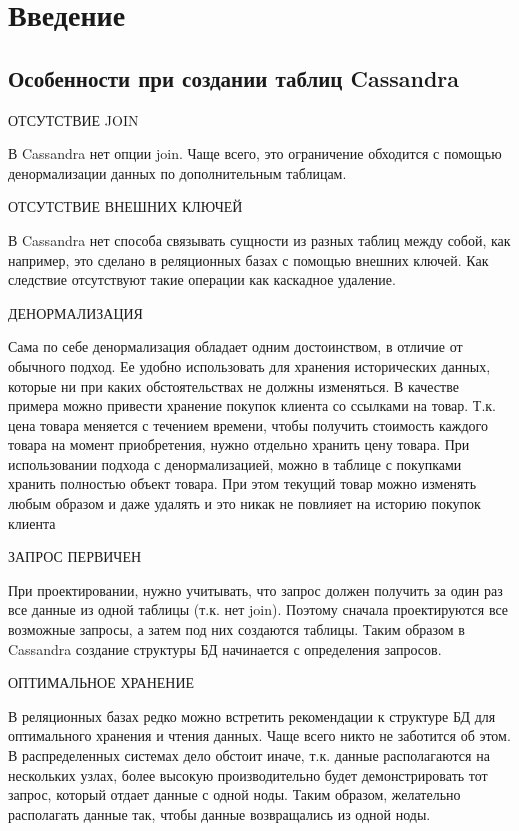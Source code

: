 \section*{\LARGE Введение}
\subsection{Особенности при создании таблиц Cassandra}
ОТСУТСТВИЕ JOIN \par
В Cassandra нет опции join. Чаще всего, это ограничение обходится с
помощью денормализации данных по дополнительным таблицам.

ОТСУТСТВИЕ ВНЕШНИХ КЛЮЧЕЙ \par
В Cassandra нет способа связывать сущности из разных таблиц между
собой, как например, это сделано в реляционных базах с помощью внешних
ключей. Как следствие отсутствуют такие операции как каскадное удаление.

ДЕНОРМАЛИЗАЦИЯ \par
Сама по себе денормализация обладает одним достоинством, в отличие от
обычного подход. Ее удобно использовать для хранения исторических данных,
которые ни при каких обстоятельствах не должны изменяться. В качестве
примера можно привести хранение покупок клиента со ссылками на товар. Т.к.
цена товара меняется с течением времени, чтобы получить стоимость каждого
товара на момент приобретения, нужно отдельно хранить цену товара. При
использовании подхода с денормализацией, можно в таблице с покупками
хранить полностью объект товара. При этом текущий товар можно изменять
любым образом и даже удалять и это никак не повлияет на историю покупок
клиента

ЗАПРОС ПЕРВИЧЕН \par
При проектировании, нужно учитывать, что запрос должен получить за
один раз все данные из одной таблицы (т.к. нет join). Поэтому сначала
проектируются все возможные запросы, а затем под них создаются таблицы.
Таким образом в Cassandra создание структуры БД начинается с определения
запросов.

ОПТИМАЛЬНОЕ ХРАНЕНИЕ \par
В реляционных базах редко можно встретить рекомендации к структуре
БД для оптимального хранения и чтения данных. Чаще всего никто не заботится
об этом. В распределенных системах дело обстоит иначе, т.к. данные
располагаются на нескольких узлах, более высокую производительно будет
демонстрировать тот запрос, который отдает данные с одной ноды. Таким
образом, желательно располагать данные так, чтобы данные возвращались из
одной ноды.

\clearpage
